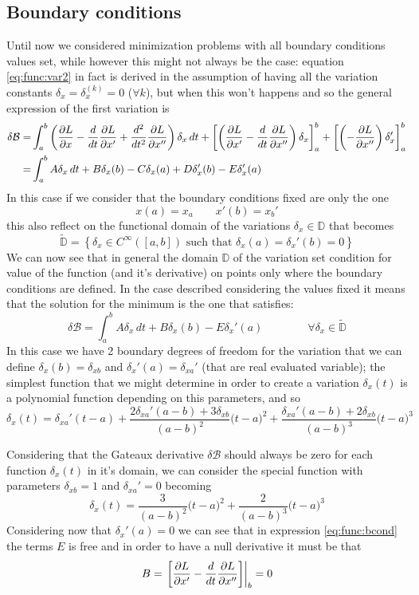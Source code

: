\subsection{Boundary conditions} 
Until now we considered minimization problems with all boundary conditions values set, while however this might not always be the case: equation \ref{eq:func:var2} in fact is derived in the assumption of having all the variation constants $\delta_x = \delta_x^{(k)} = 0$ ($\forall k$), but when this won't happens and so the general expression of the first variation is
\begin{align*}
	\delta \mathcal B=& \int_a^b \left( \frac{\partial L }{\partial x} - \frac d{dt}\frac{\partial L }{\partial x'} + \frac{d^2}{dt^2}\frac{\partial L }{\partial x''} \right) \delta_x\, dt + \left[ \left( \frac{\partial L }{\partial x'} - \frac d{dt} \frac{\partial L }{\partial x''} \right) \delta_x \right]_a^b + \left[ \left(-\frac{\partial L }{\partial x''} \right) \delta_x' \right]_a^b \\
	= & \int_a^b A\delta_x\, dt + B \delta_x(b) - C\delta_x(a) + D \delta_x'(b) - E \delta_x'(a)
\end{align*}
In this case if we consider that the boundary conditions fixed are only the one
\[ x(a) = x_a \qquad x'(b) = x_b' \]
this also reflect on the functional domain of the variations $\delta_x\in \mathds D$ that becomes
\[ \tilde {\mathds D} = \left\{ \delta_x\in C^{\infty}([a,b]) \textrm{ such that } \delta_x(a) = \delta_x'(b) = 0 \right\} \]
We can now see that in general the domain $\mathds D$ of the variation set condition for value of the function (and it's derivative) on points only where the boundary conditions are defined. In the case described considering the values fixed it means that the solution for the minimum is the one that satisfies:
\begin{equation} \label{eq:func:bcond}
	\delta\mathcal B = \int_a^b A \delta_x\, dt + B \delta_x(b) - E\delta_x'(a)  \qquad \qquad \forall \delta_x \in \tilde{\mathds D}
\end{equation}
In this case we have 2 boundary degrees of freedom for the variation that we can define $\delta_x(b) = \delta_{xb}$ and $\delta_{x}'(a) = \delta_{xa}'$ (that are real evaluated variable); the simplest function that we might determine in order to create a variation $\delta_x(t)$ is a polynomial function depending on this parameters, and so
\[ \delta_x(t) = \delta_{xa}' (t-a) + \frac{ 2\delta_{xa}'(a-b) + 3 \delta_{xb}  }{(a-b)^2} \big( t-a \big)^2 + \frac{ \delta_{xa}'(a-b) + 2 \delta_{xb} }{(a-b)^3} \big(t-a\big)^3  \]

Considering that the Gateaux derivative $\delta \mathcal B$ should always be zero for each function $\delta_x(t)$ in it's domain, we can consider the special function with parameters  $\delta_{xb} = 1$ and $\delta_{xa}' = 0$ becoming
\[ \delta_x(t) = \frac 3{(a-b)^2}\big(t-a\big)^2 + \frac 2{(a-b)^3} \big(t-a\big)^3\]
Considering now that $\delta_x'(a) = 0$ we can see that in expression \ref{eq:func:bcond} the terms $E$ is free and in order to have a null derivative it must be that 
\[ B = \left. \left[ \frac{\partial L }{\partial x'} - \frac d {dt} \frac{\partial L }{\partial x''} \right] \right|_b = 0 \]

